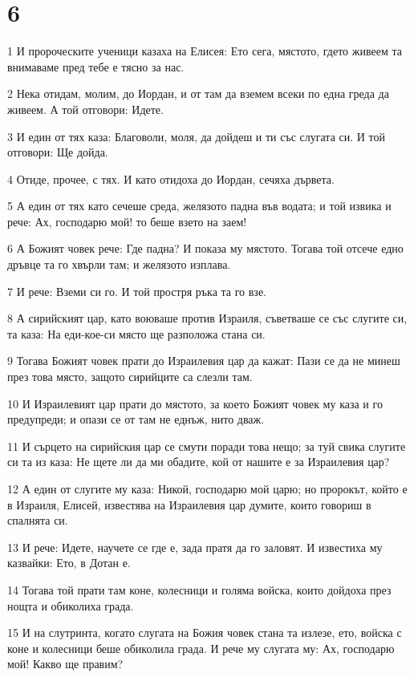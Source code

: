 \chapter{6}

\par 1 И пророческите ученици казаха на Елисея: Ето сега, мястото, гдето живеем та внимаваме пред тебе е тясно за нас.
\par 2 Нека отидам, молим, до Иордан, и от там да вземем всеки по една греда да живеем. А той отговори: Идете.
\par 3 И един от тях каза: Благоволи, моля, да дойдеш и ти със слугата си. И той отговори: Ще дойда.
\par 4 Отиде, прочее, с тях. И като отидоха до Иордан, сечяха дървета.
\par 5 А един от тях като сечеше среда, желязото падна във водата; и той извика и рече: Ах, господарю мой! то беше взето на заем!
\par 6 А Божият човек рече: Где падна? И показа му мястото. Тогава той отсече едно дръвце та го хвърли там; и желязото изплава.
\par 7 И рече: Вземи си го. И той простря ръка та го взе.
\par 8 А сирийският цар, като воюваше против Израиля, съветваше се със слугите си, та каза: На еди-кое-си място ще разположа стана си.
\par 9 Тогава Божият човек прати до Израилевия цар да кажат: Пази се да не минеш през това място, защото сирийците са слезли там.
\par 10 И Израилевият цар прати до мястото, за което Божият човек му каза и го предупреди; и опази се от там не еднъж, нито дваж.
\par 11 И сърцето на сирийския цар се смути поради това нещо; за туй свика слугите си та из каза: Не щете ли да ми обадите, кой от нашите е за Израилевия цар?
\par 12 А един от слугите му каза: Никой, господарю мой царю; но пророкът, който е в Израиля, Елисей, известява на Израилевия цар думите, които говориш в спалнята си.
\par 13 И рече: Идете, научете се где е, зада пратя да го заловят. И известиха му казвайки: Ето, в Дотан е.
\par 14 Тогава той прати там коне, колесници и голяма войска, които дойдоха през нощта и обиколиха града.
\par 15 И на слутринта, когато слугата на Божия човек стана та излезе, ето, войска с коне и колесници беше обиколила града. И рече му слугата му: Ах, господарю мой! Какво ще правим?
